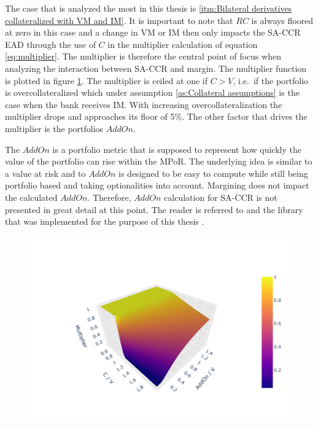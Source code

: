 \documentclass[../Thesis_AHoecherl.tex]{subfiles}
\begin{document}
The case that is analyzed the most in this thesis is \ref{itm:Bilateral derivatives collateralized with VM and IM}. It is important to note that \(RC\) is always floored at zero in this case and a change in VM or IM then only impacts the \gls{SA-CCR} \gls{EAD} through the use of \(C\) in the multiplier calculation of equation \ref{eq:multiplier}.
The multiplier is therefore the central point of focus when analyzing the interaction between SA-CCR and margin. The multiplier function is plotted in figure \ref{fig:multiplier}.
The multiplier is ceiled at one if \(C>V\), i.e.~if the portfolio is overcollateralized which under assumption \ref{as:Collateral assumptions} is the case when the bank receives \gls{IM}. With increasing overcollateralization the multiplier drops and approaches its floor of 5\%. The other factor that drives the multiplier is the portfolios \(AddOn\). 

The $AddOn$ is a portfolio metric that is supposed to represent how quickly the value of the portfolio can rise within the \gls{MPoR}. The underlying idea is similar to a value at risk and to $AddOn$ is designed to be easy to compute while still being portfolio based and taking optionalities into account. Margining does not impact the calculated $AddOn$. Therefore, $AddOn$ calculation for SA-CCR is not presented in great detail at this point. The reader is referred to  and the library that was implemented for the purpose of this thesis \cite{Hoecherl2020}.


% 

\begin{figure}
	\centering
	\includegraphics[scale=0.9]{Graphics/SACCR_Multiplier_Function.pdf}
	\caption{}
	\label{fig:multiplier}
\end{figure}
\end{document}
